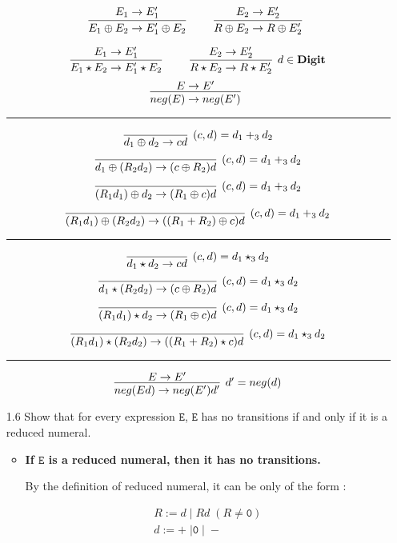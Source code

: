 \documentclass[a4paper,10pt]{article}
\newcommand{\E}{\mathtt{E}}
\newcommand{\Digit}{\mathbf{Digit}}
\newcommand{\question}[1]
{\color{DarkBlue}#1 \color{Black} \newline}
\begin{document}
\begin{enumerate}
\[
\infer[]
  {E_{1} \oplus E_{2} \rightarrow E_{1}' \oplus E_{2}}
  {E_{1} \rightarrow E_{1}'} 
\qquad
\infer[]
  {R \oplus E_{2} \rightarrow R \oplus E_{2}'}
  {E_{2} \rightarrow E_{2}'}
\]

\[
\infer[]
  {E_{1} \star E_{2} \rightarrow E_{1}' \star E_{2}}
  {E_{1} \rightarrow E_{1}'} 
\qquad
\infer[d \in \Digit]
  {R \star E_{2} \rightarrow R \star E_{2}'}
  {E_{2} \rightarrow E_{2}'}
\]
\[
\infer[]
  {neg(E) \rightarrow neg(E')}
  {E \rightarrow E'}
\]

\hrule

\[
\infer[(c, d) = d_{1} +_3 d_{2}] 
  {d_{1} \oplus d_{2} \rightarrow cd}
  {}  
\]
\[
\infer[(c, d) = d_{1} +_3 d_{2}] 
  {d_{1} \oplus (R_{2} d_{2}) \rightarrow (c \oplus R_{2}) d}
  {}  
\]
\[
\infer[(c, d) = d_{1} +_3 d_{2}] 
  {(R_{1} d_{1}) \oplus d_{2}  \rightarrow (R_{1} \oplus c) d}
  {}  
\]
\[
\infer[(c, d) = d_{1} +_3 d_{2}] 
  {(R_{1} d_{1}) \oplus (R_{2} d_{2}) \rightarrow ((R_{1} + R_{2}) \oplus c) d}
  {}  
\]

\hrule

\[
\infer[(c, d) = d_{1} \star_{3} d_{2}] 
  {d_{1} \star d_{2} \rightarrow cd}
  {}  
\]
\[
\infer[(c, d) = d_{1} \star_{3} d_{2}] 
  {d_{1} \star (R_{2} d_{2}) \rightarrow (c \oplus R_{2}) d}
  {}  
\]
\[
\infer[(c, d) = d_{1} \star_{3} d_{2}] 
  {(R_{1} d_{1}) \star d_{2}  \rightarrow (R_{1} \oplus c) d}
  {}  
\]
\[
\infer[(c, d) = d_{1} \star_{3} d_{2}] 
  {(R_{1} d_{1}) \star (R_{2} d_{2}) \rightarrow ((R_{1} + R_{2}) \star c) d}
  {}  
\]

\hrule

\[
\infer[d' = neg(d)] 
  {neg(Ed) \rightarrow neg(E')d'}  
  {E \rightarrow E'}    
\]

\question{
\item[1.6] Show that for every expression $\E$, $\E$ has no transitions if and 
only if it is a reduced numeral.
}

\begin{itemize}

	\item {\textbf{If $\E$ is a reduced numeral, then it has no transitions.}}
	
	By the definition of reduced numeral, it can be only of the form :
	
\begin{gather*}
R := d \; | \; Rd \; (R \neq \mathtt{0}) \\
d := + \; | \mathtt{0} \; | \; - 
\end{gather*}
	

\end{itemize}
\end{enumerate}
\end{document}
